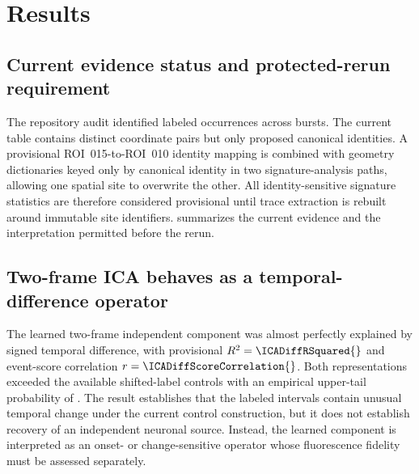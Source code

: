 \section{Results}
\label{sec:results}

\subsection{Current evidence status and protected-rerun requirement}

The repository audit identified \NCurrentOccurrences{} labeled occurrences across \NCurrentBursts{} bursts. The current table contains \NCurrentOriginalSites{} distinct coordinate pairs but only \NCurrentCanonicalNeurons{} proposed canonical identities. A provisional ROI~015-to-ROI~010 identity mapping is combined with geometry dictionaries keyed only by canonical identity in two signature-analysis paths, allowing one spatial site to overwrite the other. All identity-sensitive signature statistics are therefore considered provisional until trace extraction is rebuilt around immutable site identifiers.  summarizes the current evidence and the interpretation permitted before the rerun.



\subsection{Two-frame ICA behaves as a temporal-difference operator}

The learned two-frame independent component was almost perfectly explained by signed temporal difference, with provisional $R^2=\ICADiffRSquared{}$ and event-score correlation $r=\ICADiffScoreCorrelation{}$. Both representations exceeded the available shifted-label controls with an empirical upper-tail probability of \ICADiffShiftP{}. The result establishes that the labeled intervals contain unusual temporal change under the current control construction, but it does not establish recovery of an independent neuronal source. Instead, the learned component is interpreted as an onset- or change-sensitive operator whose fluorescence fidelity must be assessed separately.



